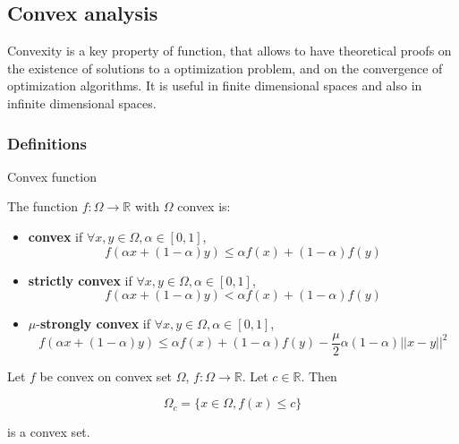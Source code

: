 \documentclass[
10pt, %
a4paper, %
oneside, %
headinclude,footinclude, %
BCOR5mm, %
]{scrartcl}
\begin{document}
\subsection{\large\color{MidnightBlue}Convex analysis}

Convexity is a key property of function, that allows to have theoretical proofs on the existence of solutions to a optimization problem, and on the convergence of optimization algorithms. It is useful in finite dimensional spaces and also in infinite dimensional spaces.

\subsubsection{\large\color{Periwinkle}Definitions}

\begin{definition}{Convex function}

    The function $f:\Omega \rightarrow \mathbb{R} $ with $\Omega$ convex is:
    \begin{itemize}
	\item \textbf{{convex}} if $\forall x, y\in \Omega, \alpha\in [0,1]$,
	    \begin{equation*}
		f(\alpha x+(1-\alpha)y)\leq \alpha f(x)+(1-\alpha)f(y)
	    \end{equation*}
	\item \textbf{{strictly convex}} if $\forall x, y\in \Omega, \alpha\in [0,1]$,
	    \begin{equation*}
		f(\alpha x+(1-\alpha)y)< \alpha f(x)+(1-\alpha)f(y)
	    \end{equation*}
	\item $\mu$-\textbf{{strongly convex}} if $\forall x, y\in \Omega, \alpha\in [0,1]$,
	    \begin{equation*}
		f(\alpha x+(1-\alpha)y)\leq \alpha f(x)+(1-\alpha)f(y)- \frac{\mu}{2} \alpha(1-\alpha)||x-y||^2
	    \end{equation*}
    \end{itemize}
\end{definition}

\begin{lemma} Let $f$ be convex on convex set $ \Omega$, $f:\Omega \rightarrow \mathbb{R} $.  Let $c\in \mathbb{R} $. Then

\begin{equation*}
    \Omega_c = \{x\in \Omega, f(x)\leq c\}
\end{equation*}
 
 is a convex set.
\end{lemma}
\end{document}
